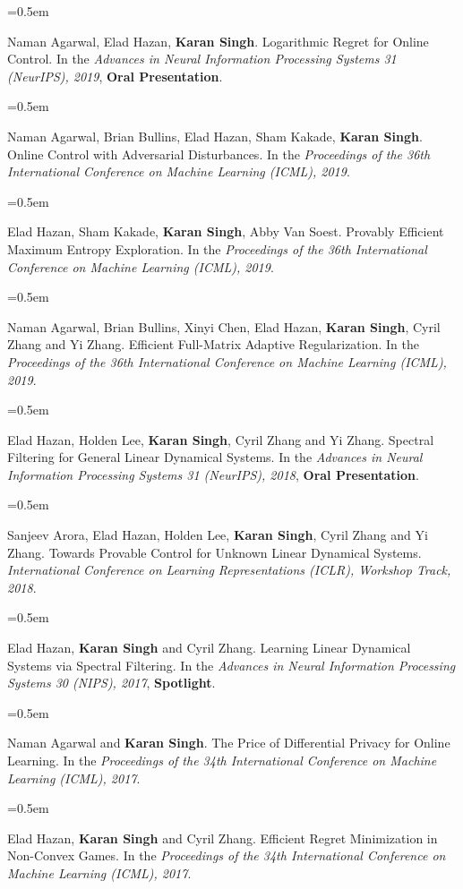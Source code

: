 \documentclass{scrartcl}
\newcommand{\Description}[1]{\hangindent=0.5em\hangafter=0\noindent\raggedright\footnotesize{#1}\par\normalsize\vspace{1em}} %
\begin{document}
\begin{cv}{}




\noindent{} 

\Description{Naman Agarwal, Elad Hazan, \textbf{Karan Singh}. Logarithmic Regret for Online Control. In the \textit{Advances in Neural Information Processing Systems 31 (NeurIPS), 2019}, \textbf{Oral Presentation}.}
\vspace{-0.2em}
\Description{Naman Agarwal, Brian Bullins, Elad Hazan, Sham Kakade, \textbf{Karan Singh}. Online Control with Adversarial Disturbances. In the \textit{Proceedings of the 36th International Conference on Machine Learning (ICML), 2019}.}
\vspace{-0.2em}
\Description{Elad Hazan, Sham Kakade, \textbf{Karan Singh}, Abby Van Soest. Provably Efficient Maximum Entropy Exploration. In the \textit{Proceedings of the 36th International Conference on Machine Learning (ICML), 2019}.}
\vspace{-0.2em}
\Description{Naman Agarwal, Brian Bullins, Xinyi Chen, Elad Hazan, \textbf{Karan Singh}, Cyril Zhang and Yi Zhang. Efficient Full-Matrix Adaptive Regularization. In the \textit{Proceedings of the 36th International Conference on Machine Learning (ICML), 2019}.}
\vspace{-0.2em}
\Description{Elad Hazan, Holden Lee, \textbf{Karan Singh}, Cyril Zhang and Yi Zhang. Spectral Filtering for General Linear Dynamical Systems. In the \textit{Advances in Neural Information Processing Systems 31 (NeurIPS), 2018}, \textbf{Oral Presentation}.}
\vspace{-0.2em}
\Description{Sanjeev Arora, Elad Hazan, Holden Lee, \textbf{Karan Singh}, Cyril Zhang and Yi Zhang. Towards Provable Control for Unknown Linear Dynamical Systems. \textit{International Conference on Learning Representations (ICLR), Workshop Track, 2018}.}
\vspace{-0.2em}
\Description{Elad Hazan, \textbf{Karan Singh} and Cyril Zhang. Learning Linear Dynamical Systems via Spectral Filtering. In the \textit{Advances in Neural Information Processing Systems 30 (NIPS), 2017}, \textbf{Spotlight}.}
\vspace{-0.2em}
\Description{Naman Agarwal and \textbf{Karan Singh}. The Price of Differential Privacy for Online Learning. In the \textit{Proceedings of the 34th International Conference on Machine Learning (ICML), 2017}.}
\vspace{-0.2em}
\Description{Elad Hazan, \textbf{Karan Singh} and Cyril Zhang. Efficient Regret Minimization in Non-Convex Games. In the \textit{Proceedings of the 34th International Conference on Machine Learning (ICML), 2017}.}


\end{cv}
\end{document}
